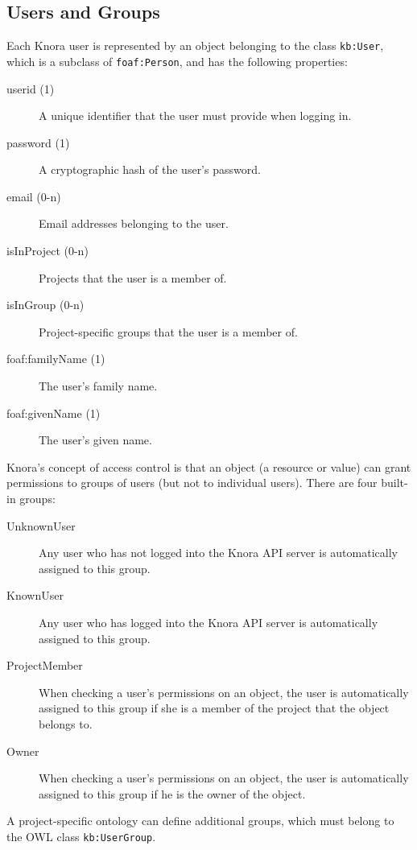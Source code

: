 \documentclass[12pt, a4paper]{article}
\begin{document}
\label{sec:authorization}

\subsection{Users and Groups}

Each Knora user is represented by an object belonging to the class \texttt{kb:User}, which is a subclass of \texttt{foaf:Person}, and has the following properties:

\begin{description}
	\item[userid (1)] A unique identifier that the user must provide when logging in.
	\item[password (1)] A cryptographic hash of the user's password.
	\item[email (0-n)] Email addresses belonging to the user.
	\item[isInProject (0-n)] Projects that the user is a member of.
	\item[isInGroup (0-n)] Project-specific groups that the user is a member of.
	\item[foaf:familyName (1)] The user's family name.
	\item[foaf:givenName (1)] The user's given name.
\end{description}

Knora's concept of access control is that an object (a resource or value) can grant permissions to groups of users (but not to individual users). There are four built-in groups:

\begin{description}
	\item[UnknownUser] Any user who has not logged into the Knora API server is automatically assigned to this group.
	\item[KnownUser] Any user who has logged into the Knora API server is automatically assigned to this group.
	\item[ProjectMember] When checking a user's permissions on an object, the user is automatically assigned to this group if she is a member of the project that the object belongs to.
	\item[Owner] When checking a user's permissions on an object, the user is automatically assigned to this group if he is the owner of the object.
\end{description}

A project-specific ontology can define additional groups, which must belong to the OWL class \texttt{kb:UserGroup}.
\end{document}
